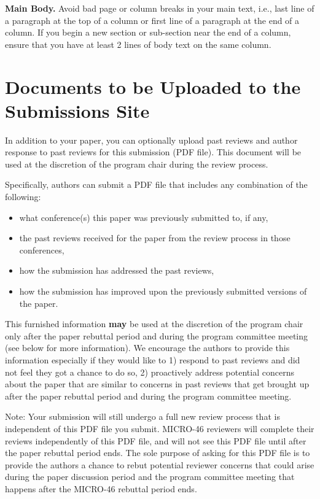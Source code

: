 \noindent\textbf{Main Body.} Avoid bad page or column breaks in
your main text, i.e., last line of a paragraph at the top of a
column or first line of a paragraph at the end of a column. If you
begin a new section or sub-section near the end of a column,
ensure that you have at least 2 lines of body text on the same
column. 

\section{Documents to be Uploaded to the Submissions Site}

In addition to your paper, you can optionally upload past reviews and
author response to past reviews for this submission (PDF file). This
document will be used at the discretion of the program chair during
the review process.

Specifically, authors can submit a PDF file that includes any
combination of the following:

\begin{itemize}
\item what conference(s) this paper was previously submitted to, if any,
\item the past reviews received for the paper from the review process in those conferences,
\item how the submission has addressed the past reviews,
\item how the submission has improved upon the previously submitted versions of the paper.
\end{itemize}

This furnished information \textbf{may} be used at the discretion of
the program chair only after the paper rebuttal period and during the
program committee meeting (see below for more information). We
encourage the authors to provide this information especially if they
would like to 1) respond to past reviews and did not feel they got a
chance to do so, 2) proactively address potential concerns about the
paper that are similar to concerns in past reviews that get brought up
after the paper rebuttal period and during the program committee
meeting.

Note: Your submission will still undergo a full new review process
that is independent of this PDF file you submit. MICRO-46 reviewers
will complete their reviews independently of this PDF file, and will
not see this PDF file until after the paper rebuttal period ends. The
sole purpose of asking for this PDF file is to provide the authors a
chance to rebut potential reviewer concerns that could arise during
the paper discussion period and the program committee meeting that
happens after the MICRO-46 rebuttal period ends.


